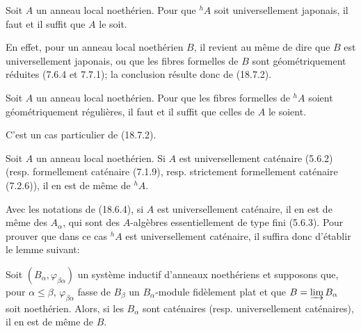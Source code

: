 \begin{corollary}[18.7.3]
\label{IV.18.7.3}
Soit $A$ un anneau local noethérien. Pour que ${}^h\!A$ soit universellement japonais, il faut et il suffit que $A$ le soit.
\end{corollary}

En effet, pour un anneau local noethérien $B$, il revient au même de dire que $B$ est universellement japonais, ou que les fibres formelles de $B$ sont géométriquement réduites (7.6.4 et 7.7.1); la conclusion résulte donc de (18.7.2).

\begin{corollary}[18.7.4]
\label{IV.18.7.4}
Soit $A$ un anneau local noethérien. Pour que les fibres formelles de ${}^h\!A$ soient géométriquement régulières, il faut et il suffit que celles de $A$ le soient.
\end{corollary}

C'est un cas particulier de (18.7.2).

\begin{proposition}[18.7.5]
\label{IV.18.7.5}
Soit $A$ un anneau local noethérien. Si $A$ est universellement caténaire (5.6.2) (resp. formellement caténaire (7.1.9), resp. strictement formellement caténaire (7.2.6)), il en est de même de ${}^h\!A$.
\end{proposition}

Avec les notations de (18.6.4), si $A$ est universellement caténaire, il en est de même des $A_\alpha$, qui sont des $A$-algèbres essentiellement de type fini (5.6.3). Pour prouver que dans ce cas ${}^h\!A$ est universellement caténaire, il suffira donc d'établir le lemme suivant:

\begin{lemma}[18.7.5.1]
\label{IV.18.7.5.1}
Soit $(B_\alpha,\varphi_{\beta\alpha})$ un système inductif d'anneaux noethériens et supposons que, pour $\alpha\leq\beta$, $\varphi_{\beta\alpha}$ fasse de $B_\beta$ un $B_\alpha$-module fidèlement plat et que $B=\varinjlim B_\alpha$ soit noethérien. Alors, si les $B_\alpha$ sont caténaires (resp. universellement caténaires), il en est de même de $B$.
\end{lemma}


